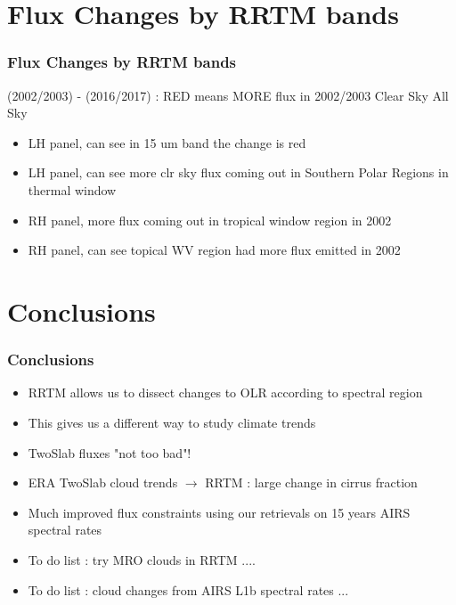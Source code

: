 \documentclass[10pt,t]{beamer}
\begin{document}
\section{Flux Changes by RRTM bands}
\begin{frame}
  \frametitle{Flux Changes by RRTM bands}
  (2002/2003) - (2016/2017) : RED means MORE flux in 2002/2003 \newline
  \hspace{0.50in} Clear Sky  \hspace{1.75in} All Sky \\
  \begin{center}
  \end{center}

  \begin{small}
    \begin{itemize}
    \item LH panel, can see in 15 um band the change is red
    \item LH panel, can see more clr sky flux coming out in Southern Polar Regions in thermal window
    \item RH panel, more flux coming out in tropical window region in 2002
    \item RH panel, can see topical WV region had more flux emitted in 2002
    \end{itemize}
  \end{small}
\end{frame}
\section{Conclusions}
\begin{frame}
  \frametitle{Conclusions}
  \begin{itemize}
  \item RRTM allows us to dissect changes to OLR according to spectral region
  \item This gives us a different way to study climate trends
  \item TwoSlab fluxes "not too bad"!
  \item ERA TwoSlab cloud trends $\rightarrow$ RRTM : large change in cirrus fraction
  \item Much improved flux constraints using our retrievals on 15 years AIRS spectral rates
  \item To do list : try MRO clouds in RRTM ....
  \item To do list : cloud changes from AIRS L1b spectral rates ...
  \end{itemize}
\end{frame}
\end{document}
